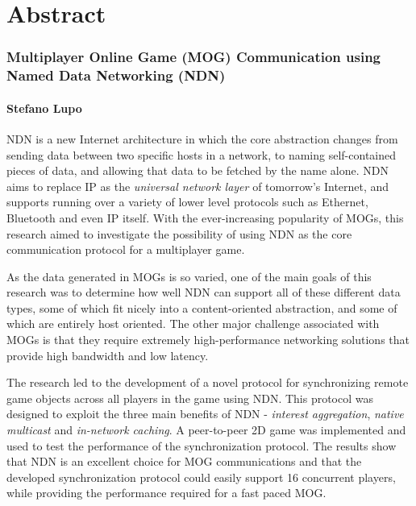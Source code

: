 \chapter*{Abstract}
\subsection*{Multiplayer Online Game (MOG) Communication using Named Data Networking (NDN)}
\subsubsection*{Stefano Lupo}
NDN is a new Internet architecture in which the core abstraction changes from sending data between two specific hosts in a network, to naming self-contained pieces of data, and allowing that data to be fetched by the name alone. NDN aims to replace IP as the \textit{universal network layer} of tomorrow's Internet, and supports running over a variety of lower level protocols such as Ethernet, Bluetooth and even IP itself. With the ever-increasing popularity of MOGs, this research aimed to investigate the possibility of using NDN as the core communication protocol for a multiplayer game.

As the data generated in MOGs is so varied, one of the main goals of this research was to determine how well NDN can support all of these different data types, some of which fit nicely into a content-oriented abstraction, and some of which are entirely host oriented. The other major challenge associated with MOGs is that they require extremely high-performance networking solutions that provide high bandwidth and low latency.

The research led to the development of a novel protocol for synchronizing remote game objects across all players in the game using NDN. This protocol was designed to exploit the three main benefits of NDN - \textit{interest aggregation}, \textit{native multicast} and \textit{in-network caching}. A peer-to-peer 2D game was implemented and used to test the performance of the synchronization protocol. The results show that NDN is an excellent choice for MOG communications and that the developed synchronization protocol could easily support 16 concurrent players, while providing the performance required for a fast paced MOG. 